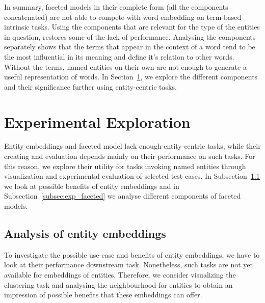 In summary, faceted models in their complete form (all the components concatenated) are not able to compete with word embedding on term-based intrinsic tasks. Using the components that are relevant for the type of the entities in question, restores some of the lack of performance. Analysing the components separately shows that the terms that appear in the context of a word tend to be the most influential in its meaning and define it's relation to other words. Without the terms, named entities on their own are not enough to generate a useful representation of words.  In Section~\ref{sec:eval_experimental}, we explore the different components and their significance further using entity-centric tasks. 
\section{Experimental Exploration}\label{sec:eval_experimental}
Entity embeddings and faceted model lack enough entity-centric tasks, while their creating and evaluation depends mainly on their performance on such tasks. For this reason, we explore their utility for tasks invoking named entities through visualization and experimental evaluation of selected test cases. In Subsection~\ref{subsec:exp_entity} we look at possible benefits of entity embeddings and in Subsection~\ref{subsec:exp_faceted} we analyse different components of faceted models. 
\subsection{Analysis of entity embeddings}\label{subsec:exp_entity}
To investigate the possible use-case and benefits of entity embeddings, we have to look at their performance downstream task. Nonetheless, such tasks are not yet available for embeddings of entities. Therefore, we consider visualizing the clustering task and analysing the neighbourhood for entities to obtain an impression of possible benefits that these embeddings can offer. 
